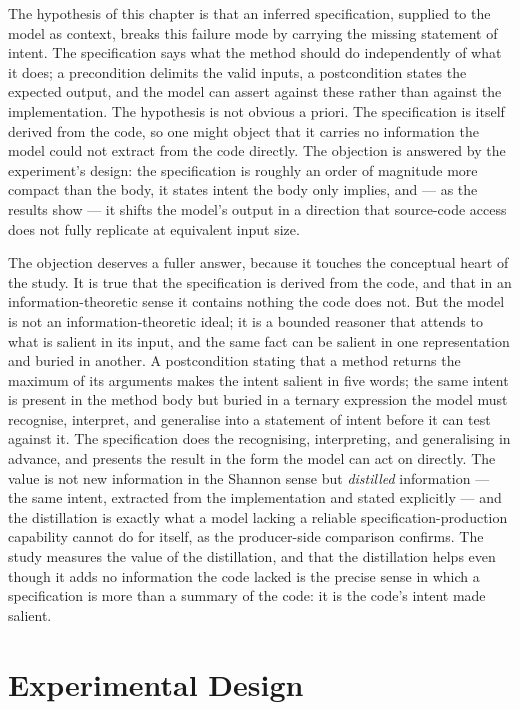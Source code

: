 The hypothesis of this chapter is that an inferred specification, supplied to
the model as context, breaks this failure mode by carrying the missing
statement of intent. The specification says what the method should do
independently of what it does; a precondition delimits the valid inputs, a
postcondition states the expected output, and the model can assert against
these rather than against the implementation. The hypothesis is not obvious a
priori. The specification is itself derived from the code, so one might object
that it carries no information the model could not extract from the code
directly. The objection is answered by the experiment's design: the
specification is roughly an order of magnitude more compact than the body, it
states intent the body only implies, and --- as the results show --- it shifts
the model's output in a direction that source-code access does not fully
replicate at equivalent input size.

The objection deserves a fuller answer, because it touches the conceptual heart of
the study. It is true that the specification is derived from the code, and that in
an information-theoretic sense it contains nothing the code does not. But the model
is not an information-theoretic ideal; it is a bounded reasoner that attends to
what is salient in its input, and the same fact can be salient in one
representation and buried in another. A postcondition stating that a method returns
the maximum of its arguments makes the intent salient in five words; the same
intent is present in the method body but buried in a ternary expression the model
must recognise, interpret, and generalise into a statement of intent before it can
test against it. The specification does the recognising, interpreting, and
generalising in advance, and presents the result in the form the model can act on
directly. The value is not new information in the Shannon sense but \emph{distilled}
information --- the same intent, extracted from the implementation and stated
explicitly --- and the distillation is exactly what a model lacking a reliable
specification-production capability cannot do for itself, as the producer-side
comparison confirms. The study measures the value of the distillation, and that the
distillation helps even though it adds no information the code lacked is the precise
sense in which a specification is more than a summary of the code: it is the code's
intent made salient.

\section{Experimental Design}
\label{sec:tg-design}

